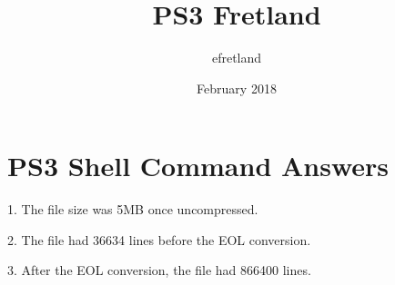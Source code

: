 \documentclass{article}
\title{PS3 Fretland}
\author{efretland }
\date{February 2018}
\begin{document}
\maketitle

\section{PS3 Shell Command Answers}
1. The file size was 5MB once uncompressed.


2. The file had 36634 lines before the EOL conversion.


3. After the EOL conversion, the file had 866400 lines.
\end{document}
